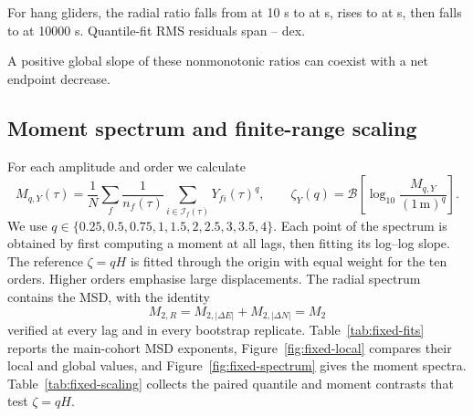 For hang gliders, the radial ratio falls from \ChThreeHangQuantRatioStart{} at 10 s to
\ChThreeHangQuantRatioMin{} at \ChThreeHangQuantRatioMinLag{} s, rises to
\ChThreeHangQuantRatioMax{} at \ChThreeHangQuantRatioMaxLag{} s, then falls to
\ChThreeHangQuantRatioEnd{} at 10000 s. Quantile-fit RMS residuals span
\ChThreeHangQuantRmsMin--\ChThreeHangQuantRmsMax{} dex.

A positive global slope of these nonmonotonic ratios can coexist with a net endpoint decrease.
\FloatBarrier

\subsection{Moment spectrum and finite-range scaling}
\label{sec:fixed-moments}

For each amplitude and order we calculate
\begin{equation}
 M_{q,Y}(\tau)=\frac1N\sum_f\frac1{n_f(\tau)}\sum_{i\in\mathcal I_f(\tau)}Y_{fi}(\tau)^q,
 \qquad \zeta_Y(q)=\mathcal B\!\left[\log_{10}\frac{M_{q,Y}}{(1\,\mathrm m)^q}\right].
 \label{eq:fixed-moments}
\end{equation}
We use $q\in\{0.25,0.5,0.75,1,1.5,2,2.5,3,3.5,4\}$. Each point of the spectrum is
obtained by first computing a moment at all lags, then fitting its log--log slope.
The reference $\zeta=qH$ is fitted through the origin with equal weight for the ten
orders. Higher orders emphasise large displacements. The radial spectrum contains
the MSD, with the identity
\begin{equation}
 M_{2,R}=M_{2,|\Delta E|}+M_{2,|\Delta N|}=M_2
 \label{eq:fixed-second-identity}
\end{equation}
verified at every lag and in every bootstrap replicate.
Table~\ref{tab:fixed-fits} reports the main-cohort MSD exponents,
Figure~\ref{fig:fixed-local} compares their local and global values, and
Figure~\ref{fig:fixed-spectrum} gives the moment spectra.
Table~\ref{tab:fixed-scaling} collects the paired quantile and moment contrasts that
test $\zeta=qH$.

